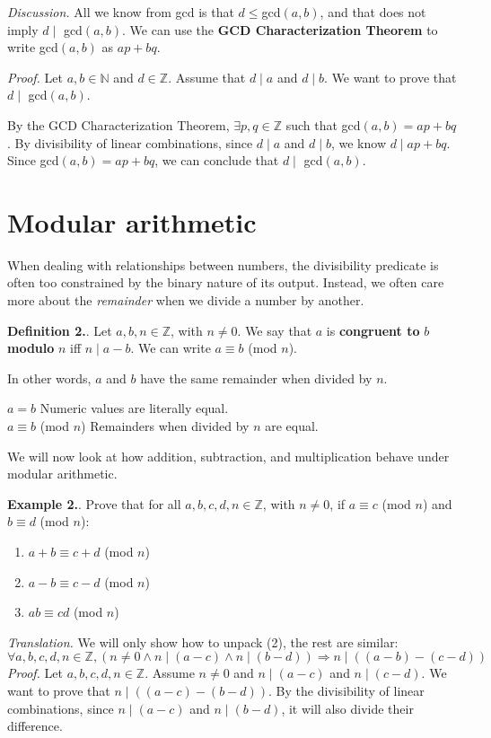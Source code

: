 \documentclass{article}
\newcounter{defcount}
\newcounter{excount}
\newcommand\df{\stepcounter{defcount} \textbf{Definition 2.\thedefcount}. }
\newcommand\ex{\stepcounter{excount} \textbf{Example 2.\theexcount}. }
\begin{document}
\textit{Discussion.} All we know from gcd is that $d \leq $gcd$(a, b)$, 
and that does not imply $d \mid$ gcd$(a, b)$. We can use the \textbf{GCD 
Characterization Theorem} to write gcd$(a, b)$ as $ap + bq$.

\textit{Proof.} Let $a, b \in \mathbb{N}$ and $d \in \mathbb{Z}$. Assume 
that $d \mid a$ and $d \mid b$. We want to prove that $d \mid$ gcd$(a, b)$. 

By the GCD Characterization Theorem, $\exists p, q \in \mathbb{Z}$ such that 
gcd$(a, b) = ap + bq$. By divisibility 
of linear combinations, since $d \mid a$ and $d \mid b$, 
we know $d \mid ap + bq$. Since gcd$(a, b) = ap + bq$, we can conclude that 
\linebreak $d \mid $ gcd$(a, b)$.

\newpage
\section{Modular arithmetic}
When dealing with relationships between numbers, the divisibility predicate
is often too constrained by the binary nature of its output. Instead, 
we often care more about the \textit{remainder} when we divide a number 
by another. 

\df Let $a, b, n \in \mathbb{Z}$, with $n \neq 0$. We say that $a$ is \linebreak
\textbf{congruent to} $b$ \textbf{modulo} $n$ iff $n \mid a - b$. We can 
write $a \equiv b$ \linebreak (mod $n$). 

In other words, $a$ and $b$ have the same remainder when divided by $n$. 

$a = b$ \hfill Numeric values are literally equal. \\
$a \equiv b$ (mod $n$) \hfill Remainders when divided by $n$ are equal. 

We will now look at how addition, subtraction, and multiplication behave 
under modular arithmetic. 

\ex Prove that for all $a, b, c, d, n \in \mathbb{Z}$, with $n \neq 0$, if 
$a \equiv c$ (mod $n$) and $b \equiv d$ (mod $n$):
\begin{enumerate}
    \item $a + b \equiv c + d$ (mod $n$)
    \item $a - b \equiv c - d$ (mod $n$)
    \item $ab \equiv cd$ (mod $n$)
\end{enumerate}
\textit{Translation.} We will only show how to unpack (2), the rest are similar:
$$\forall a, b, c, d, n \in \mathbb{Z}, (n \neq 0 \land n \mid (a-c)\land 
n \mid (b-d) ) \Rightarrow n \mid ((a - b) - (c - d))$$
\textit{Proof.} Let $a, b, c, d, n \in \mathbb{Z}$. Assume $n \neq 0$ and 
$n \mid (a -c)$ and $n \mid (c-d)$. We want to prove that $n \mid ((a-c) - 
(b - d))$. By the divisibility of linear combinations, since $n \mid (a-c)$ 
and $n \mid (b-d)$, it will also divide their difference. 
\end{document}
